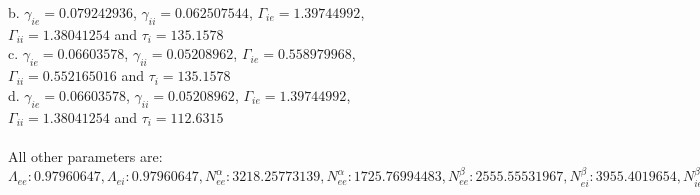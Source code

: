 \documentclass[a4paper,12pt]{article}
\begin{document}
\begin{figure}
{b. $\gamma_{ie} = 0.079242936$, $\gamma_{ii} = 0.062507544$, $\Gamma_{ie} = 1.39744992$, $\Gamma_{ii} = 1.38041254$ and $\tau_i = 135.1578$ \\
c. $\gamma_{ie} = 0.06603578$, $\gamma_{ii} = 0.05208962$, $\Gamma_{ie} = 0.558979968$, $\Gamma_{ii} = 0.552165016$ and $\tau_i = 135.1578$ \\
d. $\gamma_{ie} = 0.06603578$, $\gamma_{ii} = 0.05208962$, $\Gamma_{ie} = 1.39744992$, $\Gamma_{ii} = 1.38041254$ and $\tau_i = 112.6315$ \\
\\
All other parameters are:\\
$\Lambda_{ee}: 0.97960647, \Lambda_{ei}: 0.97960647, N^{\alpha}_{ee}: 3218.25773139, N^{\alpha}_{ee}: 1725.76994483,
N^{\beta}_{ee}: 2555.55531967, N^{\beta}_{ei}: 3955.4019654, N^{\beta}_{ie}: 558.83565101, N^{\beta}_{ii}: 805.76418084,
\Gamma_{ee}: 0.15172837, \Gamma_{ei}: 0.27123796, 
g_e: 0.7, \gamma_{ee}: 0.31475255879, \gamma_{ei}: 0.24594817, h^{rest}_e: -66.96584987, h^{eq}_{ee}: 0.0353266, h^{eq}_{ei}: -6.84352222,
h^{rest}_i: -77.90610838, h^{eq}_{ie}: -85.52639408, h^{eq}_{ii}: -85.434985,
\mu_e: -50.73253197, \mu_i: -51.66219544, \hat{p_{ee}}: 2.1687293948, \hat{p_{ei}}: 2.4342247579, p_{ie}: 0.0, p_{ii}: 0.0, \phi_{ie}: 0,
\phi_{ii}: 0, S^{max}_e: 0.101903, S^{max}_i: 0.469, \sigma_e: 6.02438944, \sigma_i: 4.21865921,
\rho_e: 2000.0, \rho_i: 2000.0, \tau_e: 139.779, \tau_i: 135.1578, \tau^{slow}: 6988.95,
  v_{ee}: 0.681401, v_{ei}: 0.681401$
}
\end{figure}
\end{document}
